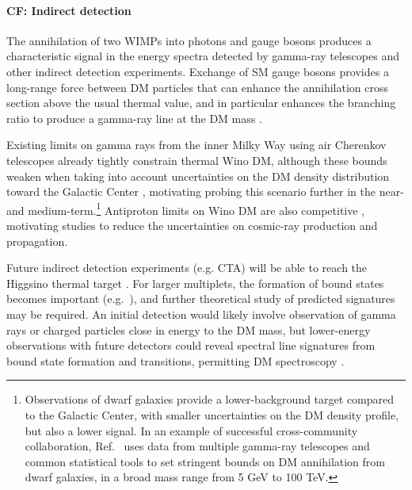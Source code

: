 \documentclass[nofootinbib]{article}
\begin{document}
\paragraph{CF: Indirect detection} The annihilation of two WIMPs into photons and gauge bosons produces a characteristic signal in the energy spectra detected by gamma-ray telescopes and other indirect detection experiments. Exchange of SM gauge bosons provides a long-range force between DM particles that can enhance the annihilation cross section above the usual thermal value, and in particular enhances the branching ratio to produce a gamma-ray line at the DM mass \cite{Hisano:2004ds}.

Existing limits on gamma rays from the inner Milky Way using air Cherenkov telescopes already tightly constrain thermal Wino DM, although these bounds weaken when taking into account uncertainties on the DM density distribution toward the Galactic Center \cite{Rinchiuso:2018ajn, Hryczuk:2019nql}, motivating probing this scenario further in the near- and medium-term.\footnote{Observations of dwarf galaxies provide a lower-background target compared to the Galactic Center, with smaller uncertainties on the DM density profile, but also a lower signal. In an example of successful cross-community collaboration, Ref.~\cite{Hess:2021cdp} uses data from multiple gamma-ray telescopes and common statistical tools to set stringent bounds on DM annihilation from dwarf galaxies, in a broad mass range from 5 GeV to 100 TeV.} Antiproton limits on Wino DM are also competitive \cite{Cuoco:2017iax}, motivating studies to reduce the uncertainties on cosmic-ray production and propagation.



Future indirect detection experiments (e.g. CTA) will be able to reach the Higgsino thermal target \cite{Hryczuk:2019nql}. For larger multiplets, the formation of bound states becomes important (e.g.~\cite{Mitridate:2017izz, Mahbubani:2020knq}), and further theoretical study of predicted signatures may be required. An initial detection would likely involve observation of gamma rays or charged particles close in energy to the DM mass, but lower-energy observations with future detectors could reveal spectral line signatures from bound state formation and transitions, permitting DM spectroscopy \cite{Mahbubani:2020knq}.
\end{document}
